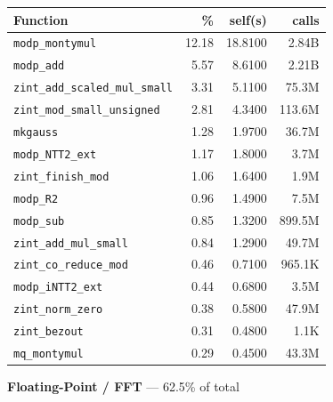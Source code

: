 \documentclass[11pt,a4paper]{article}
\begin{document}
\begin{longtable}{p{7.5cm}rrr}
\toprule
Function & \% & self(s) & calls \\
\midrule
\endhead
  \texttt{modp\_montymul} & 12.18 & 18.8100 & 2.84B \\
  \texttt{modp\_add} & 5.57 & 8.6100 & 2.21B \\
  \texttt{zint\_add\_scaled\_mul\_small} & 3.31 & 5.1100 & 75.3M \\
  \texttt{zint\_mod\_small\_unsigned} & 2.81 & 4.3400 & 113.6M \\
  \texttt{mkgauss} & 1.28 & 1.9700 & 36.7M \\
  \texttt{modp\_NTT2\_ext} & 1.17 & 1.8000 & 3.7M \\
  \texttt{zint\_finish\_mod} & 1.06 & 1.6400 & 1.9M \\
  \texttt{modp\_R2} & 0.96 & 1.4900 & 7.5M \\
  \texttt{modp\_sub} & 0.85 & 1.3200 & 899.5M \\
  \texttt{zint\_add\_mul\_small} & 0.84 & 1.2900 & 49.7M \\
  \texttt{zint\_co\_reduce\_mod} & 0.46 & 0.7100 & 965.1K \\
  \texttt{modp\_iNTT2\_ext} & 0.44 & 0.6800 & 3.5M \\
  \texttt{zint\_norm\_zero} & 0.38 & 0.5800 & 47.9M \\
  \texttt{zint\_bezout} & 0.31 & 0.4800 & 1.1K \\
  \texttt{mq\_montymul} & 0.29 & 0.4500 & 43.3M \\
\bottomrule
\end{longtable}

\noindent\colorbox{fpcolor}{\strut \textbf{Floating-Point / FFT} --- 62.5\% of total}
\vspace{2pt}
\end{document}
